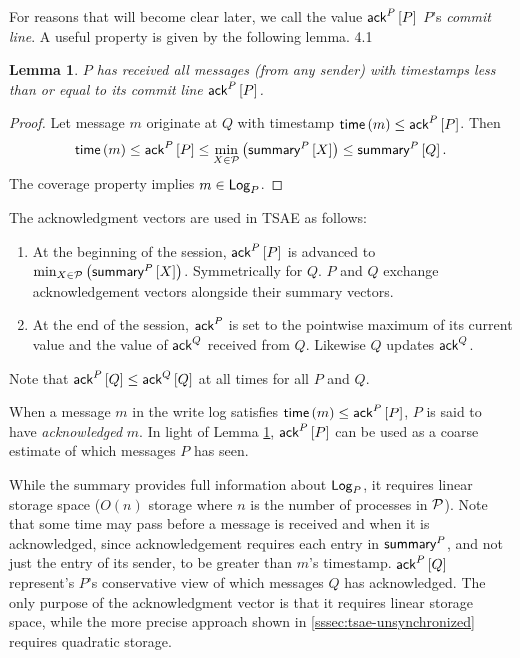 \documentclass[]             %
{NASA}                       %
\newtheorem{lemma}[theorem]{Lemma}
\theoremstyle{definition}
\begin{document}
For reasons that will become clear later, we call the value
$\textsf{ack}^{P}\left[P\right]$ $P$'s \emph{commit line}. A useful property is given by
the following lemma.
4.1%
\begin{lemma}
  \label{lem:commitline}
  $P$ has received all messages (from any sender) with timestamps less than or equal to
  its commit line $\textsf{ack}^{P}\left[P\right]$.
\end{lemma}
\begin{proof}
  Let message $m$ originate at $Q$ with timestamp
  $\mathsf{time}\left(m\right) \leq \textsf{ack}^{P}\left[P\right]$. Then
  \[\mathsf{time}\left(m\right) \leq \textsf{ack}^{P}\left[P\right] \leq \min_{X \in
      \mathcal{P}}\left(\textsf{summary}^{P}\left[X\right]\right) \leq\textsf{summary}^{P}\left[Q\right].\] The
  coverage property implies $m \in \textsf{Log}_{P}$.
\end{proof}
The acknowledgment vectors are used in TSAE as follows:
\begin{enumerate}
\item At the beginning of the session, $\textsf{ack}^{P}\left[P\right]$ is advanced to
  $\min_{X \in \mathcal{P}} \left(\textsf{summary}^{P}\left[X\right]\right)$. Symmetrically
  for $Q$. $P$ and $Q$ exchange acknowledgement vectors alongside
  their summary vectors.
\item At the end of the session, $\textsf{ack}^{P}$ is set to the pointwise
  maximum of its current value and the value of $\textsf{ack}^{Q}$ received
  from $Q$. Likewise $Q$ updates $\textsf{ack}^{Q}$.
\end{enumerate}
Note that $\textsf{ack}^{P}\left[Q\right] \leq \textsf{ack}^{Q}\left[Q\right]$ at all times for all $P$ and $Q$.

When a message $m$ in the write log satisfies
$\mathsf{time}\left(m\right) \leq \textsf{ack}^{P}\left[P\right]$, $P$ is said to have
\emph{acknowledged} $m$. In light of Lemma \ref{lem:commitline},
$\textsf{ack}^{P}\left[P\right]$ can be used as a coarse estimate of which messages $P$
has seen.

While the summary provides full information about $\textsf{Log}_{P}$, it
requires linear storage space ($O(n)$ storage where $n$ is the number
of processes in $\mathcal{P}$). Note that some time may pass before a
message is received and when it is acknowledged, since acknowledgement
requires each entry in $\textsf{summary}^{P}$, and not just the entry of its
sender, to be greater than $m$'s timestamp. $\textsf{ack}^{P}\left[Q\right]$ represent's
$P$'s conservative view of which messages $Q$ has acknowledged.  The
only purpose of the acknowledgment vector is that it requires linear
storage space, while the more precise approach shown in
\ref{sssec:tsae-unsynchronized} requires quadratic storage.
\end{document}
